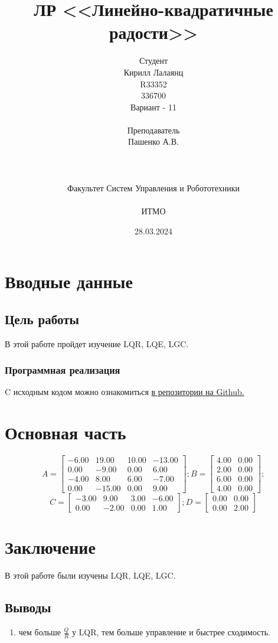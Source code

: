 \documentclass[16pt]{article}
\title{ЛР \textnumero 10 <<Линейно-квадратичные радости>>}
\author{
Студент \\
Кирилл Лалаянц\\
R33352\\
336700\\
Вариант - 11\\
\\
Преподаватель\\
Пашенко А.В. \\
\\
\\
\\
Факультет Систем Управления и Робототехники\\
\\
ИТМО\\
}
\date{28.03.2024}
\begin{document}
\maketitle
\newpage
\tableofcontents
\thispagestyle{empty}

\newpage
\setcounter{page}{1}
\section{Вводные данные}
\subsection{Цель работы}
В этой работе пройдет изучение LQR, LQE, LGC.

\subsubsection{Программная реализация}
C исходным кодом можно ознакомиться \href{https://github.com/lalayants/control-theory-itmo-2023-2024}{в репозитории на Github.}


\newpage
\section{Основная часть}
\[
   A = \begin{bmatrix}
   -6.00 &  19.00 &  10.00 & -13.00\\
    0.00 & -9.00 &  0.00 &  6.00\\
   -4.00 &  8.00 &  6.00 & -7.00\\
    0.00 & -15.00 &  0.00 &  9.00
  \end{bmatrix};
  B = \begin{bmatrix}
   4.00 &  0.00\\
   2.00 &  0.00\\
   6.00 &  0.00\\
   4.00 &  0.00
 \end{bmatrix};
\]
\[
 C = \begin{bmatrix}
   -3.00 &  9.00 &  3.00 & -6.00\\
    0.00 & -2.00 &  0.00 &  1.00
  \end{bmatrix};
  D = \begin{bmatrix}
   0.00 &  0.00\\
   0.00 &  2.00
 \end{bmatrix}
\]

\FloatBarrier


\FloatBarrier

% 

% 

\newpage
\section{Заключение}
В этой работе были изучены LQR, LQE, LGC.
\subsection{Выводы}
\begin{enumerate}
   \item чем больше \(\frac{Q}{R}\) у LQR, тем больше управление и быстрее сходимость.
\end{enumerate}
\end{document}
